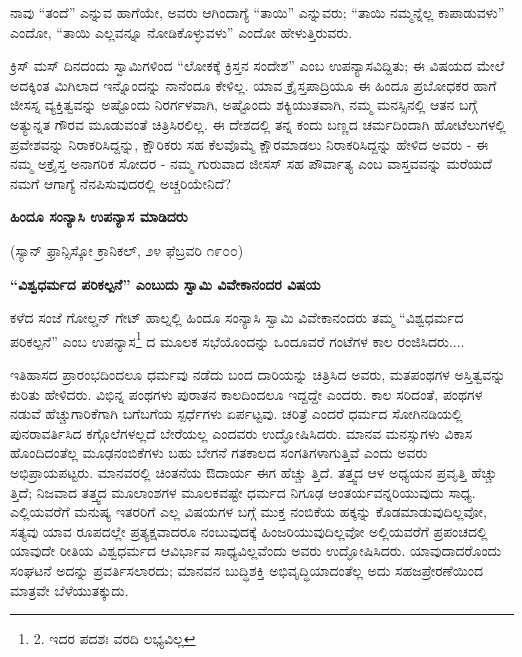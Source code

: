 ನಾವು “ತಂದೆ” ಎನ್ನುವ ಹಾಗೆಯೇ, ಅವರು ಆಗಿಂದಾಗ್ಯೆ “ತಾಯಿ” ಎನ್ನುವರು; “ತಾಯಿ ನಮ್ಮನ್ನೆಲ್ಲ ಕಾಪಾಡುವಳು” ಎಂದೋ, “ತಾಯಿ ಎಲ್ಲವನ್ನೂ ನೋಡಿಕೊಳ್ಳುವಳು” ಎಂದೋ ಹೇಳುತ್ತಿರುವರು.

ಕ್ರಿಸ್ ಮಸ್ ದಿನದಂದು ಸ್ವಾಮಿಗಳಿಂದ “ಲೋಕಕ್ಕೆ ಕ್ರಿಸ್ತನ ಸಂದೇಶ” ಎಂಬ ಉಪನ್ಯಾಸವಿದ್ದಿತು; ಈ ವಿಷಯದ ಮೇಲೆ ಅದಕ್ಕಿಂತ ಮಿಗಿಲಾದ ಇನ್ನೊಂದನ್ನು ನಾನೆಂದೂ ಕೇಳಿಲ್ಲ. ಯಾವ ಕ್ರೈಸ್ತಪಾದ್ರಿಯೂ ಈ ಹಿಂದೂ ಪ್ರಬೋಧಕರ ಹಾಗೆ ಜೀಸಸ್ನ ವ್ಯಕ್ತಿತ್ವವನ್ನು ಅಷ್ಟೊಂದು ನಿರರ್ಗಳವಾಗಿ, ಅಷ್ಟೊಂದು ಶಕ್ಯಿಯುತವಾಗಿ, ನಮ್ಮ ಮನಸ್ಸಿನಲ್ಲಿ ಆತನ ಬಗ್ಗೆ ಅತ್ಯುನ್ನತ ಗೌರವ ಮೂಡುವಂತೆ ಚಿತ್ರಿಸಿರಲಿಲ್ಲ. ಈ ದೇಶದಲ್ಲಿ ತನ್ನ ಕಂದು ಬಣ್ಣದ ಚರ್ಮದಿಂದಾಗಿ ಹೋಟೆಲುಗಳಲ್ಲಿ ಪ್ರವೇಶವನ್ನು ನಿರಾಕರಿಸಿದ್ದನ್ನು, ಕ್ಷೌರಿಕರು ಸಹ ಕೆಲವೊಮ್ಮೆ ಕ್ಷೌರಮಾಡಲು ನಿರಾಕರಿಸಿದ್ದನ್ನು ಹೇಳಿದ ಅವರು - ಈ ನಮ್ಮ ಅಕ್ರೈಸ್ತ ಅನಾಗರಿಕ ಸೋದರ - ನಮ್ಮ ಗುರುವಾದ ಜೀಸಸ್ ಸಹ ಪೌರ್ವಾತ್ಯ ಎಂಬ ವಾಸ್ತವವನ್ನು ಮರೆಯದೆ ನಮಗೆ ಆಗಾಗ್ಯೆ ನೆನಪಿಸುವುದರಲ್ಲಿ ಅಚ್ಚರಿಯೇನಿದೆ?

\begin{center}
\textbf{ಹಿಂದೂ ಸಂನ್ಯಾಸಿ ಉಪನ್ಯಾಸ ಮಾಡಿದರು}
\end{center}

\begin{center}
(ಸ್ಯಾನ್ ಫ್ರಾನ್ಸಿಸ್ಕೋ ಕ್ರಾನಿಕಲ್, ೨೪ ಫೆಬ್ರವರಿ ೧೯೦೦)
\end{center}

\begin{center}
\textbf{“ವಿಶ್ವಧರ್ಮದ ಪರಿಕಲ್ಪನೆ” ಎಂಬುದು ಸ್ವಾಮಿ ವಿವೇಕಾನಂದರ ವಿಷಯ}
\end{center}

ಕಳೆದ ಸಂಜೆ ಗೋಲ್ಡನ್ ಗೇಟ್ ಹಾಲ್ನಲ್ಲಿ ಹಿಂದೂ ಸಂನ್ಯಾಸಿ ಸ್ವಾಮಿ ವಿವೇಕಾನಂದರು ತಮ್ಮ “ವಿಶ್ವಧರ್ಮದ ಪರಿಕಲ್ಪನೆ” ಎಂಬ ಉಪನ್ಯಾಸ\footnote{2. ಇದರ ಪದಶಃ ವರದಿ ಲಭ್ಯವಿಲ್ಲ} ದ ಮೂಲಕ ಸಭೆಯೊಂದನ್ನು ಒಂದೂವರೆ ಗಂಟೆಗಳ ಕಾಲ ರಂಜಿಸಿದರು....

ಇತಿಹಾಸದ ಪ್ರಾರಂಭದಿಂದಲೂ ಧರ್ಮವು ನಡೆದು ಬಂದ ದಾರಿಯನ್ನು ಚಿತ್ರಿಸಿದ ಅವರು, ಮತಪಂಥಗಳ ಅಸ್ತಿತ್ವವನ್ನು ಕುರಿತು ಹೇಳಿದರು. ವಿಭಿನ್ನ ಪಂಥಗಳು ಪುರಾತನ ಕಾಲದಿಂದಲೂ ಇದ್ದದ್ದೇ ಎಂದರು. ಕಾಲ ಸರಿದಂತೆ, ಪಂಥಗಳ ನಡುವೆ ಹೆಚ್ಚುಗಾರಿಕೆಗಾಗಿ ಬಗೆಬಗೆಯ ಸ್ಪರ್ಧೆಗಳು ಏರ್ಪಟ್ಟವು. ಚರಿತ್ರೆ ಎಂದರೆ ಧರ್ಮದ ಸೋಗಿನಡಿಯಲ್ಲಿ ಪುನರಾವರ್ತಿಸಿದ ಕಗ್ಗೊಲೆಗಳಲ್ಲದೆ ಬೇರೆಯಲ್ಲ ಎಂದವರು ಉದ್ಘೋಷಿಸಿದರು. ಮಾನವ ಮನಸ್ಸುಗಳು ವಿಕಾಸ ಹೊಂದಿದಂತೆಲ್ಲ ಮೂಢನಂಬಿಕೆಗಳು ಬಹು ಬೇಗನೆ ಗತಕಾಲದ ಸಂಗತಿಗಳಾಗುತ್ತಿವೆ ಎಂದು ಅವರು ಅಭಿಪ್ರಾಯಪಟ್ಟರು. ಮಾನವರಲ್ಲಿ ಚಿಂತನೆಯ ಔದಾರ್ಯ ಈಗ ಹೆಚ್ಚು ತ್ತಿದೆ. ತತ್ತ್ವದ ಆಳ ಅಧ್ಯಯನ ಪ್ರವೃತ್ತಿ ಹೆಚ್ಚು ತ್ತಿದೆ; ನಿಜವಾದ ತತ್ತ್ವದ ಮೂಲಾಂಶಗಳ ಮೂಲಕವಷ್ಟೇ ಧರ್ಮದ ನಿಗೂಢ ಆಂತರ್ಯವನ್ನರಿಯುವುದು ಸಾಧ್ಯ. ಎಲ್ಲಿಯವರೆಗೆ ಮನುಷ್ಯ ಇತರರಿಗೆ ಎಲ್ಲ ವಿಷಯಗಳ ಬಗ್ಗೆ ಮುಕ್ತ ನಂಬಿಕೆಯ ಹಕ್ಕನ್ನು ಕೊಡಮಾಡುವುದಿಲ್ಲವೋ, ಸತ್ಯವು ಯಾವ ರೂಪದಲ್ಲೇ ಪ್ರತ್ಯಕ್ಷವಾದರೂ ನಂಬುವುದಕ್ಕೆ ಹಿಂಜರಿಯುವುದಿಲ್ಲವೋ ಅಲ್ಲಿಯವರೆಗೆ ಪ್ರಪಂಚದಲ್ಲಿ ಯಾವುದೇ ರೀತಿಯ ವಿಶ್ವಧರ್ಮದ ಆವಿರ್ಭಾವ ಸಾಧ್ಯವಿಲ್ಲವೆಂದು ಅವರು ಉದ್ಘೋಷಿಸಿದರು. ಯಾವುದಾದರೊಂದು ಸಂಘಟನೆ ಅದನ್ನು ಪ್ರವರ್ತಿಸಲಾರದು; ಮಾನವನ ಬುದ್ಧಿಶಕ್ತಿ ಅಭಿವೃದ್ಧಿಯಾದಂತೆಲ್ಲ ಅದು ಸಹಜಪ್ರೇರಣೆಯಿಂದ ಮಾತ್ರವೇ ಬೆಳೆಯುತಕ್ಕುದು.

